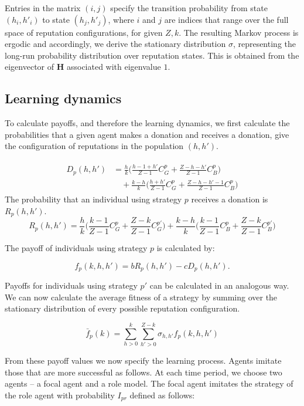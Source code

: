 \documentclass[sigconf]{aamas}  %
\begin{document}
Entries in the matrix $(i,j)$ specify the transition probability from state $(h_i,h'_i)$ to state $(h_j,h'_j)$, where $i$ and $j$ are indices that range over the full space of reputation configurations, for given $Z,k$. The resulting Markov process is ergodic and accordingly, we derive the stationary distribution $\sigma$, representing the long-run probability distribution over reputation states. This is obtained from the eigenvector of $\mathbf{H}$ associated with eigenvalue $1$.

\subsection{Learning dynamics}
To calculate payoffs, and therefore the learning dynamics, we first calculate the probabilities that a given agent makes a donation and receives a donation, give the configuration of reputations in the population $(h,h')$.

\begin{align*}
    \begin{split}
	    D_{p}(h,h') & =  \frac{h}{k}\bigg(\frac{h-1+h'}{Z-1}C_{G}^{p}+\frac{Z-h-h'}{Z-1}C_{B}^{p}\bigg)  \\
	    & \quad  + \frac{k-h}{k}\bigg(\frac{h+h'}{Z-1}C_{G}^{p}+\frac{Z-h-h'-1}{Z-1}C_{B}^{p}\bigg)
    \end{split}
\end{align*}
The probability that an individual using strategy $p$ receives a donation is $R_{p}(h,h')$.
\[R_{p}(h,h') = \frac{h}{k}\bigg(\frac{k-1}{Z-1}C_{G}^{p}+\frac{Z-k}{Z-1}C_{G}^{p'}\bigg)+\frac{k-h}{k}\bigg(\frac{k-1}{Z-1}C_{B}^{p}+\frac{Z-k}{Z-1}C_{B}^{p'}\bigg)\]

The payoff of individuals using strategy $p$ is calculated by: 

$$f_{p}(k,h,h') = b R_{p}(h,h')-c D_{p}(h,h').$$ 

Payoffs for individuals using strategy $p'$ can be calculated in an analogous way.
We can now calculate the average fitness of a strategy by summing over the stationary distribution of every possible reputation configuration.

\[\bar{f}_{p}(k) = \sum_{h>0}^{k} \sum_{h'>0}^{Z-k} \sigma_{h,h'} f_{p}(k,h,h')\]

From these payoff values we now specify the learning process. Agents imitate those that are more successful as follows. At each time period, we choose two agents -- a focal agent and a role model. The focal agent imitates the strategy of the role agent with probability $I_{pr}$ defined as follows:
\end{document}
